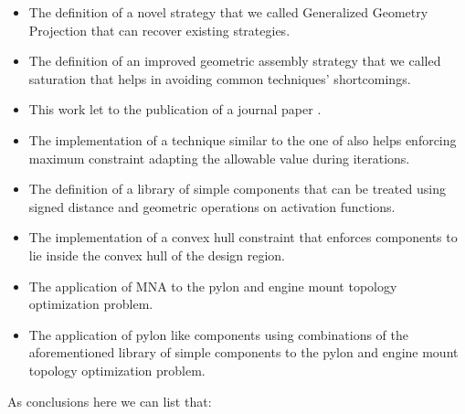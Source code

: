 \begin{itemize}
\item The definition of a novel strategy that we called Generalized Geometry Projection that can recover existing strategies.
\item The definition of an improved geometric assembly strategy that we called saturation that helps in avoiding common techniques' shortcomings.
\item This work let to the publication of a journal paper \cite{coniglio2019generalized}.
\item The implementation of a technique similar to the one of \cite{le2010stress} also helps enforcing maximum constraint adapting the allowable value during iterations. 
\item The definition of a library of simple components that can be treated using signed distance and geometric operations on activation functions.
\item The implementation of a convex hull constraint that enforces components to lie inside the convex hull of the design region.
\item The application of MNA to the pylon and engine mount topology optimization problem.
\item The application of pylon like components using combinations of the aforementioned library of simple components to the pylon and engine mount topology optimization problem.
\end{itemize}
As conclusions here we can list that:
